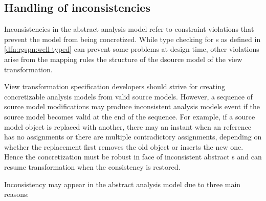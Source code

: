 \subsection{Handling of inconsistencies}
\label{ssec:transform:inconsistent}

Inconsistencies in the abstract  analysis model refer to constraint violations that prevent the model from being concretized. While type checking for s as defined in \vref{dfn:rgspn:well-typed} can prevent some problems at design time, other violations arise from the mapping rules the structure of the dsource model of the view transformation.

View transformation specification developers should strive for creating concretizable analysis models from valid source models. However, a sequence of source model modifications may produce inconsistent analysis models event if the source model becomes valid at the end of the sequence. For example, if a source model object is replaced with another, there may an instant when an  reference has no assignments or there are multiple contradictory assignments, depending on whether the replacement first removes the old object or inserts the new one. Hence the concretization must be robust in face of inconsistent abstract s and can resume transformation when the consistency is restored.

Inconsistency may appear in the abstract analysis model due to three main reasons:


